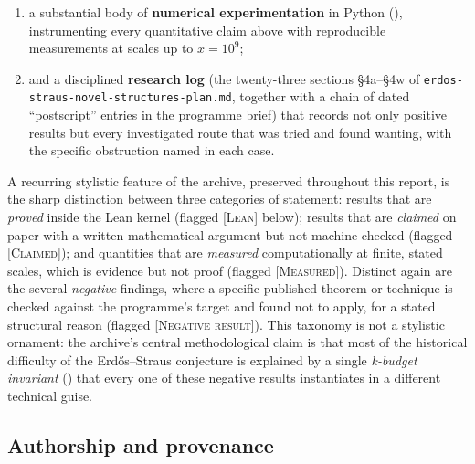 \documentclass[11pt]{article}
\theoremstyle{plain}
\theoremstyle{definition}
\theoremstyle{remark}
\newcommand{\LEAN}{\textcolor{proved}{\textsc{[Lean]}}}
\newcommand{\CLAIMED}{\textcolor{claimed}{\textsc{[Claimed]}}}
\newcommand{\NEGATIVE}{\textcolor{negative}{\textsc{[Negative result]}}}
\newcommand{\MEASURED}{\textcolor{claimed}{\textsc{[Measured]}}}
\renewcommand{\_}{\textunderscore\allowbreak}
\begin{document}
\begin{enumerate}[leftmargin=1.6em]
        establish the covering claim it needs;
  \item a substantial body of \textbf{numerical experimentation} in Python
        (), instrumenting every quantitative claim above with reproducible
        measurements at scales up to $x=10^9$;
  \item and a disciplined \textbf{research log} (the twenty-three sections \S4a--\S4w of
        \texttt{erdos-\allowbreak straus-\allowbreak novel-\allowbreak structures-\allowbreak plan.md}, together with a chain of dated
        ``postscript'' entries in the programme brief) that records not only positive results
        but every investigated route that was tried and found wanting, with the specific
        obstruction named in each case.
\end{enumerate}
A recurring stylistic feature of the archive, preserved throughout this report, is the sharp
distinction between three categories of statement: results that are \emph{proved} inside the
Lean kernel (flagged \LEAN{} below); results that are \emph{claimed} on paper with a written
mathematical argument but not machine-checked (flagged \CLAIMED{}); and quantities that are
\emph{measured} computationally at finite, stated scales, which is evidence but not proof
(flagged \MEASURED{}). Distinct again are the several \emph{negative} findings, where a
specific published theorem or technique is checked against the programme's target and found not
to apply, for a stated structural reason (flagged \NEGATIVE{}). This taxonomy is not a
stylistic ornament: the archive's central methodological claim is that most of the historical
difficulty of the Erd\H{o}s--Straus conjecture is explained by a single \emph{k-budget
invariant} () that every one of these negative results instantiates in a
different technical guise.

\subsection{Authorship and provenance}
\label{subsec:provenance}
\end{document}
